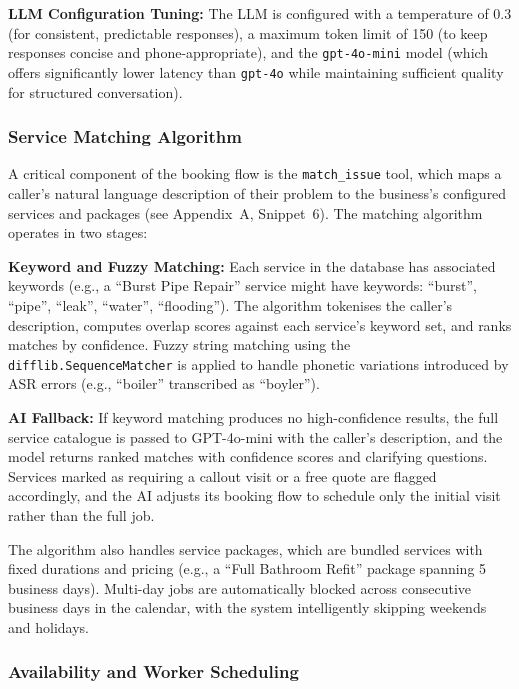 \documentclass[conference]{IEEEtran}
\begin{document}
\textbf{LLM Configuration Tuning:} The LLM is configured with a temperature of 0.3 (for consistent, predictable responses), a maximum token limit of 150 (to keep responses concise and phone-appropriate), and the \texttt{gpt-4o-mini} model (which offers significantly lower latency than \texttt{gpt-4o} while maintaining sufficient quality for structured conversation).


\subsubsection{Service Matching Algorithm}

A critical component of the booking flow is the \texttt{match\_issue} tool, which maps a caller's natural language description of their problem to the business's configured services and packages (see Appendix~A, Snippet~6). The matching algorithm operates in two stages:

\textbf{Keyword and Fuzzy Matching:} Each service in the database has associated keywords (e.g., a ``Burst Pipe Repair'' service might have keywords: ``burst'', ``pipe'', ``leak'', ``water'', ``flooding''). The algorithm tokenises the caller's description, computes overlap scores against each service's keyword set, and ranks matches by confidence. Fuzzy string matching using the \texttt{difflib.SequenceMatcher} is applied to handle phonetic variations introduced by ASR errors (e.g., ``boiler'' transcribed as ``boyler'').

\textbf{AI Fallback:} If keyword matching produces no high-confidence results, the full service catalogue is passed to GPT-4o-mini with the caller's description, and the model returns ranked matches with confidence scores and clarifying questions. Services marked as requiring a callout visit or a free quote are flagged accordingly, and the AI adjusts its booking flow to schedule only the initial visit rather than the full job.

The algorithm also handles service packages, which are bundled services with fixed durations and pricing (e.g., a ``Full Bathroom Refit'' package spanning 5 business days). Multi-day jobs are automatically blocked across consecutive business days in the calendar, with the system intelligently skipping weekends and holidays.

\subsubsection{Availability and Worker Scheduling}
\end{document}
